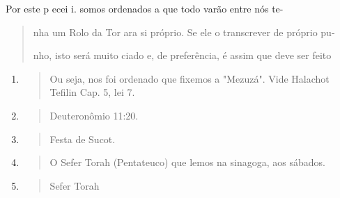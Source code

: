 Por este p ecei i. somos ordenados a que todo varão entre nós te-

\begin{quote}
nha um Rolo da Tor ara si próprio. Se ele o transcrever de próprio pu-

nho, isto será muito ciado e, de preferência, é assim que deve ser feito
\end{quote}

\begin{enumerate}
\def\labelenumi{\arabic{enumi}.}
\setcounter{enumi}{38}
\item
  \begin{quote}
  Ou seja, nos foi ordenado que fixemos a "Mezuzá". Vide Halachot
  Tefilin Cap. 5, lei 7.
  \end{quote}
\item
  \begin{quote}
  Deuteronômio 11:20.
  \end{quote}
\item
  \begin{quote}
  Festa de Sucot.
  \end{quote}
\item
  \begin{quote}
  O Sefer Torah (Pentateuco) que lemos na sinagoga, aos sábados.
  \end{quote}
\item
  \begin{quote}
  Sefer Torah
  \end{quote}
\end{enumerate}

